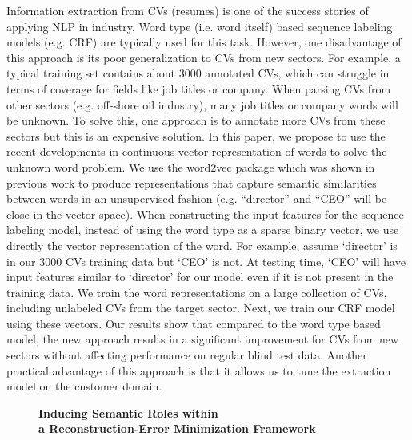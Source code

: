 \documentclass[10pt, a4paper, twopage, headinclude, footinclude, BCOR5mm]{scrartcl}
\begin{document}
{{\noindent
Information extraction from CVs (resumes) is one of the success stories of applying NLP in industry. Word type (i.e. word itself) based sequence labeling models (e.g. CRF) are typically used for this task. However, one disadvantage of this approach is its poor generalization to CVs from new sectors. For example, a typical training set contains about 3000 annotated CVs, which can struggle in terms of coverage for fields like job titles or company. When parsing CVs from other sectors (e.g. off-shore oil industry), many job titles or company words will be unknown. To solve this, one approach is to annotate more CVs from these sectors but this is an expensive solution.   In this paper, we propose to use the recent developments in continuous vector representation of words to solve the unknown word problem. We use the word2vec package which was shown in previous work to produce representations that capture semantic similarities between words in an unsupervised fashion (e.g. “director” and “CEO” will be close in the vector space). When constructing the input features for the sequence labeling model, instead of using the word type as a sparse binary vector, we use directly the vector representation of the word. For example, assume ‘director’ is in our 3000 CVs training data but ‘CEO’ is not. At testing time, ‘CEO’ will have input features similar to ‘director’ for our model even if it is not present in the training data.  We train the word representations on a large collection of CVs, including unlabeled CVs from the target sector. Next, we train our CRF model using these vectors. Our results show that compared to the word type based model, the new approach results in a significant improvement for CVs from new sectors without affecting performance on regular blind test data. Another practical advantage of this approach is that it allows us to tune the extraction model on the customer domain.


\newpage

\begin{figure}[t!]
\centering
\large\textbf{Inducing Semantic Roles within \\ a Reconstruction-Error Minimization Framework}
\vspace*{0.5cm}
\end{figure}


        \begin{table}[t!]
\end{table}}}
\end{document}
